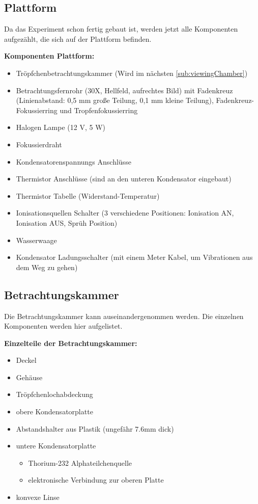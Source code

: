 \subsection{Plattform}\label{sub:inhaltApparatur}
Da das Experiment schon fertig gebaut ist, werden jetzt alle Komponenten aufgezählt, die sich auf der Plattform befinden.

\noindent \textbf{Komponenten Plattform:}

\begin{itemize}\label{item:apparatur}
	\item Tröpfchenbetrachtungskammer (Wird im nächsten \autoref{sub:viewingChamber})
	\item Betrachtungsfernrohr (30X, Hellfeld, aufrechtes Bild) mit Fadenkreuz (Linienabstand: 0,5 mm große Teilung, 0,1 mm kleine Teilung), Fadenkreuz-Fokussierring und Tropfenfokussierring
	\item Halogen Lampe (12 V, 5 W)
	\item Fokussierdraht
	\item Kondensatorenspannungs Anschlüsse
	\item Thermistor Anschlüsse (sind an den unteren Kondensator eingebaut)
	\item Thermistor Tabelle (Widerstand-Temperatur)
	\item Ionisationsquellen Schalter (3 verschiedene Positionen: Ionisation AN, Ionisation AUS, Sprüh Position)
	\item Wasserwaage
	\item Kondensator Ladungsschalter (mit einem Meter Kabel, um Vibrationen aus dem Weg zu gehen)
\end{itemize}


\subsection{Betrachtungskammer}\label{sub:viewingChamber}
Die Betrachtungskammer kann auseinandergenommen werden. Die einzelnen Komponenten werden hier aufgelistet.

\noindent \textbf{Einzelteile der Betrachtungskammer:}

\begin{itemize}\label{item:betrachtungskammer}
	\item Deckel
	\item Gehäuse
	\item Tröpfchenlochabdeckung
	\item obere Kondensatorplatte
	\item Abstandshalter aus Plastik (ungefähr 7.6mm dick)
	\item untere Kondensatorplatte
	\begin{itemize}
		\item Thorium-232 Alphateilchenquelle
		\item elektronische Verbindung zur oberen Platte
	\end{itemize}
	\item konvexe Linse
\end{itemize}

